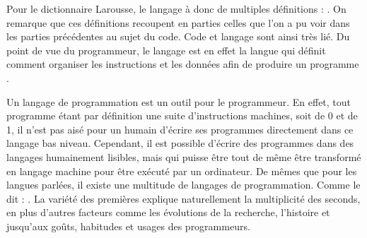\documentclass[12pt]{article} %
\begin{document}
Pour le dictionnaire Larousse, le langage à donc de multiples définitions :
\cite{Nimmo2017-ya}. On remarque que ces définitions recoupent en parties celles que l'on a pu voir dans les parties précédentes au sujet du code. Code et langage sont ainsi très lié. Du point de vue du programmeur, le langage est en effet la langue qui définit comment organiser les instructions et les données afin de produire un programme \cite{BernardAmade2019}.

Un langage de programmation est un outil pour le programmeur. En effet, tout programme étant par définition une suite d'instructions machines, soit de 0 et de 1, il n'est pas aisé pour un humain d'écrire ses programmes directement dans ce langage bas niveau. Cependant, il est possible d'écrire des programmes dans des langages humainement lisibles, mais qui puisse être tout de même être transformé en langage machine pour être exécuté par un ordinateur. De mêmes que pour les langues parlées, il existe une multitude de langages de programmation. Comme le dit \citeauthor{BernardAmade2019} :  \cite{BernardAmade2019}. La variété des premières explique naturellement la multiplicité des seconds, en plus d'autres facteurs comme les évolutions de la recherche, l'histoire et jusqu'aux goûts, habitudes et usages des programmeurs.
\end{document}
